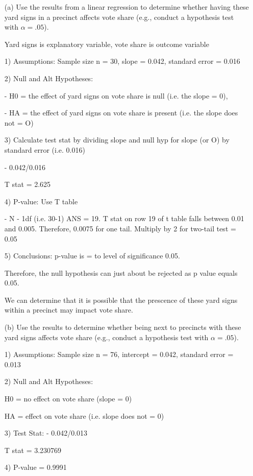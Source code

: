 \documentclass[12pt,letterpaper]{article}
\begin{document}
\vspace{.5cm}
\begin{enumerate}
	\item [(a)] Use the results from a linear regression to determine whether having these yard signs in a precinct affects vote share (e.g., conduct a hypothesis test with $\alpha = .05$).

Yard signs is explanatory variable, vote share is outcome variable

1) Assumptions: Sample size n = 30, slope = 0.042, standard error = 0.016

2) Null and Alt Hypotheses: 

- H0 = the effect of yard signs on vote share is null (i.e. the slope = 0), 

- HA = the effect of yard signs on vote share is present (i.e. the slope does not = O) 

3) Calculate test stat by dividing slope and null hyp for slope (or O) by standard error (i.e. 0.016)
	
-	0.042/0.016 

T stat = 2.625

4) P-value: Use T table

- N - 1df (i.e. 30-1) ANS = 19. T stat on row 19 of t table falls between 0.01 and 0.005. Therefore, 0.0075 for one tail. Multiply by 2 for two-tail test = 0.05

5) Conclusions: p-value is = to level of significance 0.05. 

Therefore, the null hypothesis can  just about be rejected as p value equals 0.05. 

We can determine that it is possible that the prescence of these yard signs within a precinct may impact vote share. 
	\newpage		
	\item [(b)]  Use the results to determine whether being
	next to precincts with these yard signs affects vote
	share (e.g., conduct a hypothesis test with $\alpha = .05$).

1) Assumptions: Sample size n = 76, intercept = 0.042, standard error = 0.013

2) Null and Alt Hypotheses: 

H0 = no effect on vote share (slope = 0)

HA = effect on vote share (i.e. slope does not = 0)

3) Test Stat: 
	- 0.042/0.013 

T stat = 3.230769

4) P-value = 0.9991


\end{enumerate}
\end{document}
